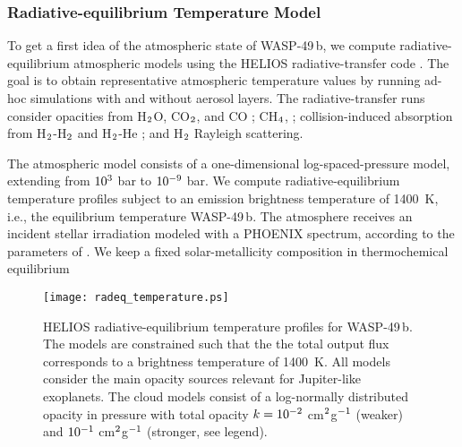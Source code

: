 \documentclass[tighten, times, twocolumn]{aastex61}  %
\newcommand\ttt[1]{10\sp{#1}}
\let\oldmsp=\sp
\let\oldmsb=\sb
\def\sp#1{\ifmmode
           \oldmsp{#1}%
         \else\strut\raise.85ex\hbox{\scriptsize #1}\fi}
\def\sb#1{\ifmmode
           \oldmsb{#1}%
         \else\strut\raise-.54ex\hbox{\scriptsize #1}\fi}
\newcommand\molhyd{H$\sb{2}$}
\newcommand\methane{CH$\sb{4}$}
\newcommand\water{H$\sb{2}$O}
\newcommand\carbdiox{CO$\sb{2}$}
\begin{document}
\subsubsection{Radiative-equilibrium Temperature Model}
\label{sec:radeq}

To get a first idea of the atmospheric state of WASP-49\,b, we compute
radiative-equilibrium atmospheric models using the HELIOS
radiative-transfer code \citep{MalikEtal2017apjHelios}.  The goal is
to obtain representative atmospheric temperature values by running
ad-hoc simulations with and without aerosol layers.  The
radiative-transfer runs consider  opacities from {\water}, {\carbdiox}, and
CO ;
{\methane}, ;
collision-induced absorption from {\molhyd}-{\molhyd} and
{\molhyd}-He ; and {\molhyd}
Rayleigh scattering.

The atmospheric model consists of a one-dimensional
log-spaced-pressure model, extending from $\ttt{3}$ bar to $\ttt{-9}$
bar.  We compute radiative-equilibrium temperature profiles subject to
an emission brightness temperature of 1400~K, i.e., the equilibrium
temperature WASP-49\,b.  The atmosphere receives an incident stellar
irradiation modeled with a PHOENIX spectrum, according to the
parameters of \citet{LendlEtal2016aaWASP49bTransmissionFORS2}.  We
keep a fixed solar-metallicity composition in thermochemical
equilibrium 

\begin{figure}[t]
\centering
\texttt{[image: radeq\_temperature.ps]}
\caption{
HELIOS radiative-equilibrium temperature profiles for WASP-49\,b.  The
models are constrained such that the the total output flux corresponds
to a brightness temperature of 1400~K.  All models consider the main
opacity sources relevant for Jupiter-like exoplanets.  The cloud
models consist of a log-normally distributed opacity in pressure with
total opacity $k = \ttt{-2}$ cm$\sp{2}$g$\sp{-1}$ (weaker) and $\ttt{-1}$
cm$\sp{2}$g$\sp{-1}$ (stronger, see legend).}
\label{fig:helios}
\end{figure}
\end{document}
